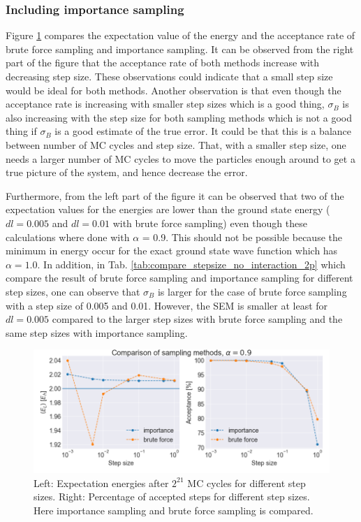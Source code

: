 \subsubsection{Including importance sampling}

Figure \ref{fig:comparing_sampling} compares the expectation value of the energy and the acceptance rate of brute force sampling and importance sampling. It can be observed from the right part of the figure that the acceptance rate of both methods increase with decreasing step size. These observations could indicate that a small step size would be ideal for both methods. Another observation is that even though the acceptance rate is increasing with smaller step sizes which is a good thing, $\sigma_B$ is also increasing with the step size for both sampling methods  which is not a good thing if $\sigma_B$ is a good estimate of the true error. It could be that this is a balance between number of MC cycles and step size. That, with a smaller step size, one needs a larger number of MC cycles to move the particles enough around to get a true picture of the system, and hence decrease the error.

Furthermore, from the left part of the figure it can be observed that two of the expectation values for the energies are lower than the ground state energy ($dl = 0.005$ and $dl = 0.01$ with brute force sampling) even though these calculations where done with $\alpha$ = 0.9. This should not be possible because the minimum in energy occur for the exact ground state wave function which has $\alpha=1.0$. In addition, in Tab. \ref{tab:compare_stepsize_no_interaction_2p} which compare the result of brute force sampling and importance sampling for different step sizes, one can observe that $\sigma_B$ is larger for the case of brute force sampling with a step size of 0.005 and 0.01. However,  the SEM is smaller at least for $dl = 0.005$ compared to the larger step sizes with brute force sampling and the same step sizes with importance sampling. 

\begin{figure}[H]
\center
\includegraphics[width=0.85\linewidth]{../Results/comparing_sampling}\caption{Left: Expectation energies after $2^{21}$ MC cycles for different step sizes. Right: Percentage of accepted steps for different step sizes. Here importance sampling and brute force sampling is compared. }\label{fig:comparing_sampling}
\end{figure}


